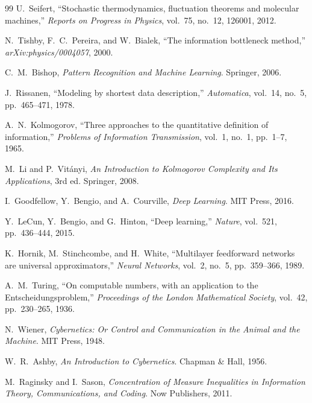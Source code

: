 \documentclass[12pt]{article}
\theoremstyle{plain}
\theoremstyle{definition}
\theoremstyle{remark}
\begin{document}
\begin{thebibliography}{99}
U.~Seifert,
``Stochastic thermodynamics, fluctuation theorems and molecular machines,''
\textit{Reports on Progress in Physics}, vol.~75, no.~12, 126001, 2012.

N.~Tishby, F.~C.~Pereira, and W.~Bialek,
``The information bottleneck method,''
\textit{arXiv:physics/0004057}, 2000.

C.~M.~Bishop,
\textit{Pattern Recognition and Machine Learning}.
Springer, 2006.

J.~Rissanen,
``Modeling by shortest data description,''
\textit{Automatica}, vol.~14, no.~5, pp.~465--471, 1978.

A.~N.~Kolmogorov,
``Three approaches to the quantitative definition of information,''
\textit{Problems of Information Transmission}, vol.~1, no.~1, pp.~1--7, 1965.

M.~Li and P.~Vitányi,
\textit{An Introduction to Kolmogorov Complexity and Its Applications}, 3rd ed.
Springer, 2008.

I.~Goodfellow, Y.~Bengio, and A.~Courville,
\textit{Deep Learning}.
MIT Press, 2016.

Y.~LeCun, Y.~Bengio, and G.~Hinton,
``Deep learning,''
\textit{Nature}, vol.~521, pp.~436--444, 2015.

K.~Hornik, M.~Stinchcombe, and H.~White,
``Multilayer feedforward networks are universal approximators,''
\textit{Neural Networks}, vol.~2, no.~5, pp.~359--366, 1989.

A.~M.~Turing,
``On computable numbers, with an application to the Entscheidungsproblem,''
\textit{Proceedings of the London Mathematical Society}, vol.~42, pp.~230--265, 1936.

N.~Wiener,
\textit{Cybernetics: Or Control and Communication in the Animal and the Machine}.
MIT Press, 1948.

W.~R.~Ashby,
\textit{An Introduction to Cybernetics}.
Chapman \& Hall, 1956.

M.~Raginsky and I.~Sason,
\textit{Concentration of Measure Inequalities in Information Theory, Communications, and Coding}.
Now Publishers, 2011.

\end{thebibliography}
\end{document}
